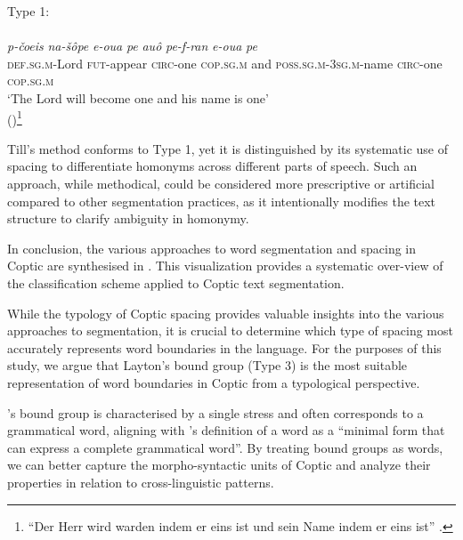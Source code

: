 \documentclass[output=paper,colorlinks,citecolor=brown ,chinesefont]{langscibook}
\begin{document}
\begin{exe}
\ex\label{type1} Type 1: \citet[51]{till} \\
\glll {}        \\
\textit{p-čoeis} \textit{na-šôpe} \textit{e-oua} \textit{pe} \textit{auô} \textit{pe-f-ran} \textit{e-oua} 		\textit{pe}\\
\textsc{def}.\textsc{sg}.\textsc{m}-Lord \textsc{fut}-appear \textsc{circ}-one \textsc{cop}.\textsc{sg}.\textsc{m} and \textsc{poss}.\textsc{sg}.\textsc{m}-3\textsc{sg}.\textsc{m}-name \textsc{circ}-one \textsc{cop}.\textsc{sg}.\textsc{m} \\
\glt ‘The Lord will become one and his name is one' \\
\hspace*{\fill}()\footnote{“Der Herr wird warden indem er eins ist und sein Name indem er eins ist” \citep[51]{till}. }
\end{exe}


Till's method conforms to Type 1, yet it is distinguished by its systematic use of spacing to differentiate homonyms across different parts of speech. Such an approach, while methodical, could be considered more prescriptive or artificial compared to other segmentation practices, as it intentionally modifies the text structure to clarify ambiguity in homonymy.

In conclusion, the various approaches to word segmentation and spacing in Coptic are synthesised in . This visualization provides a systematic over-view of the classification scheme applied to Coptic text segmentation.

While the typology of Coptic spacing provides valuable insights into the various approaches to segmentation, it is crucial to determine which type of spacing most accurately represents word boundaries in the language. For the purposes of this study, we argue that Layton's bound group (Type 3) is the most suitable representation of word boundaries in Coptic from a typological perspective.

\citet{layton1}'s bound group is characterised by a single stress and often corresponds to a grammatical word, aligning with \citet{haspelmath2023}'s definition of a word as a “minimal form that can express a complete grammatical word”. By treating bound groups as words, we can better capture the morpho-syntactic units of Coptic and analyze their properties in relation to cross-linguistic patterns.
\end{document}
